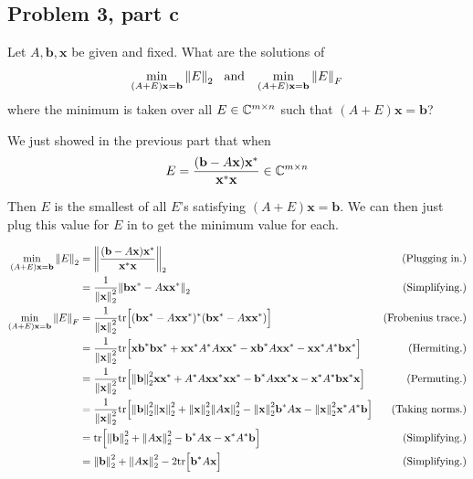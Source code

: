 \newpage
\subsection{Problem 3, part c}
Let $A, \textbf{b}, \textbf{x}$ be given and fixed. What are the solutions of 
\[
    \min_{(A+E)\textbf{x} = \textbf{b}} \norm{E}_2 \hspace{3mm} \text{and} \hspace{3mm} \min_{(A+E)\textbf{x} = \textbf{b}} \norm{E}_F
\]
where the minimum is taken over all $E \in \mathbb{C}^{m\times n}$ such that $(A+E)\textbf{x} = \textbf{b}$?
\partbreak
\begin{solution}

We just showed in the previous part that when 
\[
    E = \frac{(\textbf{b} - A\textbf{x})\textbf{x}^*}{\textbf{x}^*\textbf{x}} \in \mathbb{C}^{m\times n}
\] 

 Then $E$ is the smallest of all $E$'s satisfying $(A+E)\textbf{x} = \textbf{b}$. We can then just plug this value for $E$ in to get the minimum value for each.

 \alignbreak
 \begin{align}
     \min_{(A+E)\textbf{x} = \textbf{b}} \norm{E}_2 &= \norm{\frac{(\textbf{b} - A\textbf{x})\textbf{x}^*}{\textbf{x}^*\textbf{x}}}_2 &\text{(Plugging in.)}\nonumber\\
     &= \frac{1}{\norm{\textbf{x}}_2^2}\norm{\textbf{b}\textbf{x}^* - A\textbf{x}\textbf{x}^*}_2 &\text{(Simplifying.)}\nonumber\\
     \min_{(A+E)\textbf{x} = \textbf{b}} \norm{E}_F &= \frac{1}{\norm{\textbf{x}}_2^2}\text{tr}\Big[ (\textbf{b}\textbf{x}^* - A\textbf{x}\textbf{x}^*)^*(\textbf{b}\textbf{x}^* - A\textbf{x}\textbf{x}^*)\Big] &\text{(Frobenius trace.)}\nonumber\\
     &= \frac{1}{\norm{\textbf{x}}_2^2}\text{tr}\Big[ \textbf{x}\textbf{b}^*\textbf{b}\textbf{x}^* + \textbf{x}\textbf{x}^*A^*A\textbf{x}\textbf{x}^* - \textbf{x}\textbf{b}^*A\textbf{x}\textbf{x}^* - \textbf{x}\textbf{x}^*A^*\textbf{b}\textbf{x}^*\Big] &\text{(Hermiting.)}\nonumber\\
     &= \frac{1}{\norm{\textbf{x}}_2^2}\text{tr}\Big[ \norm{\textbf{b}}_2^2\textbf{x}\textbf{x}^* + A^*A\textbf{x}\textbf{x}^*\textbf{x}\textbf{x}^* - \textbf{b}^*A\textbf{x}\textbf{x}^*\textbf{x} - \textbf{x}^*A^*\textbf{b}\textbf{x}^*\textbf{x}\Big] &\text{(Permuting.)}\nonumber\\
     &= \frac{1}{\norm{\textbf{x}}_2^2}\text{tr}\Big[ \norm{\textbf{b}}_2^2\norm{\textbf{x}}_2^2 + \norm{\textbf{x}}_2^2\norm{A\textbf{x}}_2^2 - \norm{\textbf{x}}_2^2\textbf{b}^*A\textbf{x} - \norm{\textbf{x}}_2^2\textbf{x}^*A^*\textbf{b}\Big] &\text{(Taking norms.)}\nonumber\\
     &= \text{tr}\Big[ \norm{\textbf{b}}_2^2 + \norm{A\textbf{x}}_2^2 - \textbf{b}^*A\textbf{x} - \textbf{x}^*A^*\textbf{b}\Big] &\text{(Simplifying.)}\nonumber\\
     &= \norm{\textbf{b}}_2^2 + \norm{A\textbf{x}}_2^2 - 2\text{tr} \Big[ \textbf{b}^*A\textbf{x}\Big] &\text{(Simplifying.)}\nonumber
 \end{align}
 \alignbreak
\end{solution}


